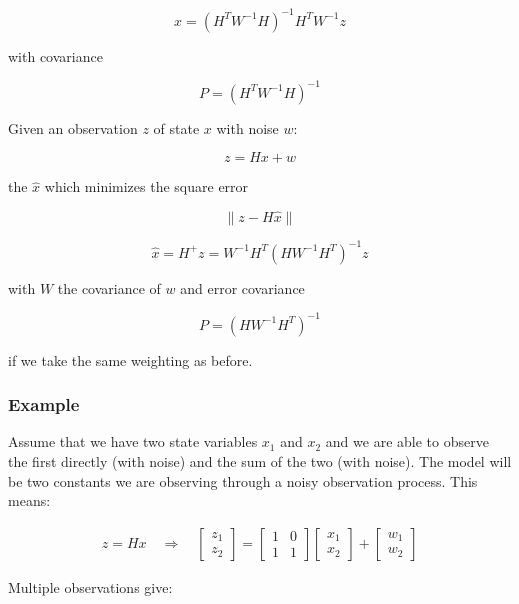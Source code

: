 \[\hat{x} = \left(H^T W^{-1} H\right)^{-1} H^TW^{-1}z\]

with covariance

\[P = \left(H^T W^{-1} H\right)^{-1}\]

Given an observation \(z\) of state \(x\) with noise \(w\):

\[z = Hx+w\]

the \(\hat{x}\) which minimizes the square error

\[\| z - H\hat{x}\|\]

\[\hat{x} = H^+z = W^{-1} H^T\left(H W^{-1} H^T\right)^{-1}z\]

with \(W\) the covariance of \(w\) and error covariance

\[P = \left(H W^{-1} H^T\right)^{-1}\]

if we take the same weighting as before.

\hypertarget{kalman-example-1}{%
\subsubsection{Example}\label{kalman-example-1}}

Assume that we have two state variables \(x_1\) and \(x_2\) and we are
able to observe the first directly (with noise) and the sum of the two
(with noise). The model will be two constants we are observing through a
noisy observation process. This means:

\[\begin{aligned}
z = Hx \quad \Rightarrow \quad
\begin{bmatrix}
 z_1 \\ z_2
\end{bmatrix}
=
\begin{bmatrix}
 1 & 0 \\
1 & 1
\end{bmatrix}
\begin{bmatrix}
 x_1 \\ x_2
\end{bmatrix}
+
\begin{bmatrix}
 w_1 \\ w_2
\end{bmatrix}
\end{aligned}\]

Multiple observations give:

